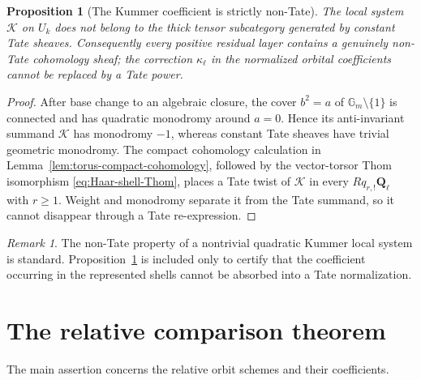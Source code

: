 \documentclass[11pt]{article}
\newtheorem{proposition}[theorem]{Proposition}
\theoremstyle{definition}
\theoremstyle{remark}
\newtheorem{remark}[theorem]{Remark}
\newcommand{\Qell}{\mathbf Q_\ell}
\newcommand{\Uk}{U_k}
\newcommand{\kappaell}{\kappa_{\ell}}
\newcommand{\cK}{\mathcal K}
\begin{document}
\begin{proposition}[The Kummer coefficient is strictly non-Tate]
\label{prop:strict-non-Tate-Kummer}
The local system $\cK$ on $\Uk$ does not belong to the thick tensor
subcategory generated by constant Tate sheaves.  Consequently every positive
residual layer contains a genuinely non-Tate cohomology sheaf; the correction
$\kappaell$ in the normalized orbital coefficients cannot be replaced by a
Tate power.
\end{proposition}

\begin{proof}
After base change to an algebraic closure, the cover $b^2=a$ of
$\mathbb G_m\setminus\{1\}$ is connected and has quadratic monodromy around
$a=0$.  Hence its anti-invariant summand $\cK$ has monodromy $-1$, whereas
constant Tate sheaves have trivial geometric monodromy.  The compact
cohomology calculation in Lemma~\ref{lem:torus-compact-cohomology}, followed
by the vector-torsor Thom isomorphism
\eqref{eq:Haar-shell-Thom}, places a Tate twist of $\cK$ in every
$Rq_{r,!}\Qell$ with $r\ge1$.  Weight and monodromy separate it from the Tate
summand, so it cannot disappear through a Tate re-expression.
\end{proof}

\begin{remark}
The non-Tate property of a nontrivial quadratic Kummer local system is
standard.  Proposition~\ref{prop:strict-non-Tate-Kummer} is included only to
certify that the coefficient occurring in the represented shells cannot be
absorbed into a Tate normalization.
\end{remark}


\section{The relative comparison theorem}
\label{sec:main-theorem-status}

The main assertion concerns the relative orbit schemes and their coefficients.
\end{document}
